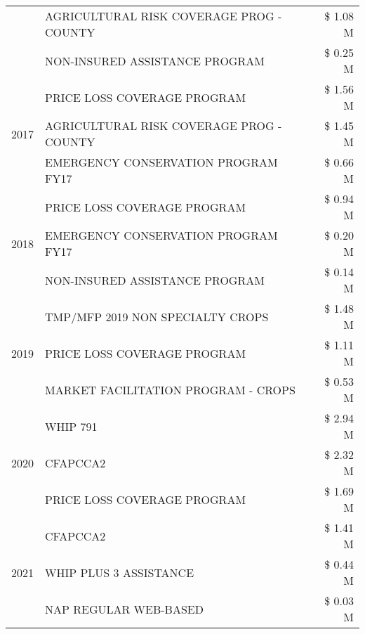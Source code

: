 \begin{tabular}{llr}
 & AGRICULTURAL RISK COVERAGE PROG - COUNTY & \$ 1.08 M \\
 & NON-INSURED ASSISTANCE PROGRAM & \$ 0.25 M \\
\cline{1-3}
\multirow[t]{3}{*}{2017} & PRICE LOSS COVERAGE PROGRAM & \$ 1.56 M \\
 & AGRICULTURAL RISK COVERAGE PROG - COUNTY & \$ 1.45 M \\
 & EMERGENCY CONSERVATION PROGRAM FY17 & \$ 0.66 M \\
\cline{1-3}
\multirow[t]{3}{*}{2018} & PRICE LOSS COVERAGE PROGRAM & \$ 0.94 M \\
 & EMERGENCY CONSERVATION PROGRAM FY17 & \$ 0.20 M \\
 & NON-INSURED ASSISTANCE PROGRAM & \$ 0.14 M \\
\cline{1-3}
\multirow[t]{3}{*}{2019} & TMP/MFP 2019 NON SPECIALTY CROPS & \$ 1.48 M \\
 & PRICE LOSS COVERAGE PROGRAM & \$ 1.11 M \\
 & MARKET FACILITATION PROGRAM - CROPS & \$ 0.53 M \\
\cline{1-3}
\multirow[t]{3}{*}{2020} & WHIP 791 & \$ 2.94 M \\
 & CFAPCCA2 & \$ 2.32 M \\
 & PRICE LOSS COVERAGE PROGRAM & \$ 1.69 M \\
\cline{1-3}
\multirow[t]{3}{*}{2021} & CFAPCCA2 & \$ 1.41 M \\
 & WHIP PLUS 3 ASSISTANCE & \$ 0.44 M \\
 & NAP REGULAR WEB-BASED & \$ 0.03 M \\
\cline{1-3}
\bottomrule
\end{tabular}
